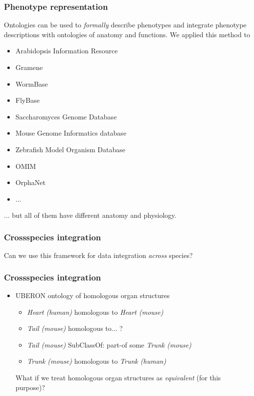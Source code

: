 \documentclass{beamer}
\renewcommand{\em}{\itshape}
\begin{document}
\begin{frame}
  \frametitle{Phenotype representation} 
  Ontologies can be used to {\em formally} 
  describe phenotypes and integrate phenotype descriptions with
  ontologies of anatomy and functions. We applied this method to
\begin{itemize}
\item Arabidopsis Information Resource
\item Gramene
\item WormBase
\item FlyBase
\item Saccharomyces Genome Database
\item Mouse Genome Informatics database
\item Zebrafish Model Organism Database
\item OMIM
\item OrphaNet
\item ...
\end{itemize}
\pause
... but all of them have different anatomy and physiology.
\end{frame}

\begin{frame}
  \frametitle{Crossspecies integration}
  \begin{center}
    Can we use this framework for data integration {\em across} species?
  \end{center}
\end{frame}

\begin{frame}
  \frametitle{Crossspecies integration}
  \begin{itemize}
  \item UBERON ontology of homologous organ structures
    \begin{itemize}
    \item {\em Heart (human)} homologous to {\em Heart (mouse)}
    \pause
    \item {\em Tail (mouse)} homologous to... ?
      \pause
    \item {\em Tail (mouse)} SubClassOf: part-of some {\em Trunk
        (mouse)}
    \item {\em Trunk (mouse)} homologous to {\em Trunk (human)}
    \end{itemize}
    What if we treat homologous organ structures as {\em equivalent}
    (for this purpose)?
  \end{itemize}
\end{frame}
\end{document}

